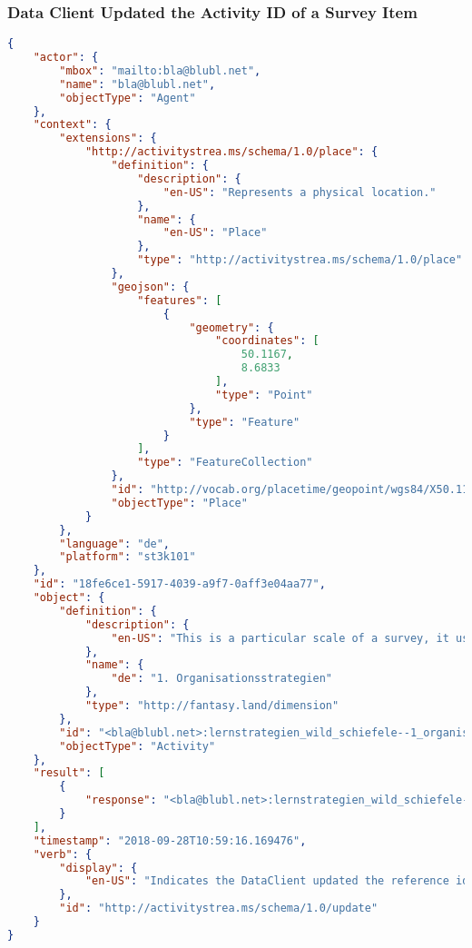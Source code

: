 \subsubsection*{Data Client Updated the Activity ID of a Survey Item}
\begin{lstlisting}[language=JSON]
{
    "actor": {
        "mbox": "mailto:bla@blubl.net",
        "name": "bla@blubl.net",
        "objectType": "Agent"
    },
    "context": {
        "extensions": {
            "http://activitystrea.ms/schema/1.0/place": {
                "definition": {
                    "description": {
                        "en-US": "Represents a physical location."
                    },
                    "name": {
                        "en-US": "Place"
                    },
                    "type": "http://activitystrea.ms/schema/1.0/place"
                },
                "geojson": {
                    "features": [
                        {
                            "geometry": {
                                "coordinates": [
                                    50.1167,
                                    8.6833
                                ],
                                "type": "Point"
                            },
                            "type": "Feature"
                        }
                    ],
                    "type": "FeatureCollection"
                },
                "id": "http://vocab.org/placetime/geopoint/wgs84/X50.1167Y8.6833.html",
                "objectType": "Place"
            }
        },
        "language": "de",
        "platform": "st3k101"
    },
    "id": "18fe6ce1-5917-4039-a9f7-0aff3e04aa77",
    "object": {
        "definition": {
            "description": {
                "en-US": "This is a particular scale of a survey, it usually contains multiple questions."
            },
            "name": {
                "de": "1. Organisationsstrategien"
            },
            "type": "http://fantasy.land/dimension"
        },
        "id": "<bla@blubl.net>:lernstrategien_wild_schiefele--1_organisationsstrategien",
        "objectType": "Activity"
    },
    "result": [
        {
            "response": "<bla@blubl.net>:lernstrategien_wild_schiefele--1_organisationsstrategien--new-id"
        }
    ],
    "timestamp": "2018-09-28T10:59:16.169476",
    "verb": {
        "display": {
            "en-US": "Indicates the DataClient updated the reference id."
        },
        "id": "http://activitystrea.ms/schema/1.0/update"
    }
}
\end{lstlisting}
